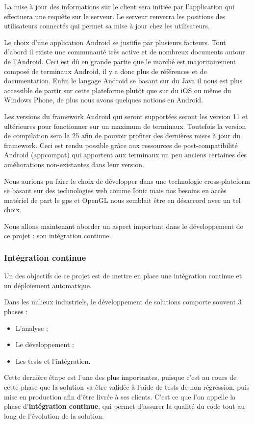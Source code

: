 La mise à jour des informations sur le client sera initiée par l’application qui effectuera une requête sur le serveur. Le serveur renverra les positions des utilisateurs connectés qui permet sa mise à jour chez les utilisateurs.

Le choix d'une application Android se justifie par plusieurs facteurs. Tout d’abord il existe une communauté très active et de nombreux documents autour de l’Android. Ceci est dû en grande partie que le marché est majoritairement composé de terminaux Android, il y a donc plus de références et de documentation. Enfin le langage Android se basant sur du Java il nous est plus accessible de partir sur cette plateforme plutôt que sur du iOS ou même du Windows Phone, de plus nous avons quelques notions en Android.

Les versions du framework Android qui seront supportées seront les version 11 et ultérieures pour fonctionner sur un maximum de terminaux. Toutefois la version de compilation sera la 25 afin de pouvoir profiter des dernières mises à jour du framework. Ceci est rendu possible grâce aux ressources de post-compatibilité Android (appcompat) qui apportent aux terminaux un peu anciens certaines des améliorations non-existantes dans leur version.

Nous aurions pu faire le choix de développer dans une technologie cross-plateform se basant sur des technologies web comme Ionic mais nos besoins en accès matériel de part le gps et OpenGL nous semblait être en désaccord avec un tel choix.

Nous allons maintenant aborder un aspect important dans le développement de ce projet : son intégration continue.

\subsubsection{Intégration continue}

Un des objectifs de ce projet est de mettre en place une intégration continue et un déploiement automatique.

Dans les milieux industriels, le développement de solutions comporte souvent 3 phases :
\begin{itemize}
    \item L'analyse ;
    \item Le développement ;
    \item Les tests et l'intégration.
\end{itemize}

Cette dernière étape est l'une des plus importantes, puisque c'est au cours de cette phase que la solution va être validée à l'aide de tests de non-régréssion, puis mise en production afin d'être livrée à ses clients. C'est ce que l'on appelle la phase d'\textbf{intégration continue}, qui permet d'assurer la qualité du code tout au long de l'évolution de la solution.


